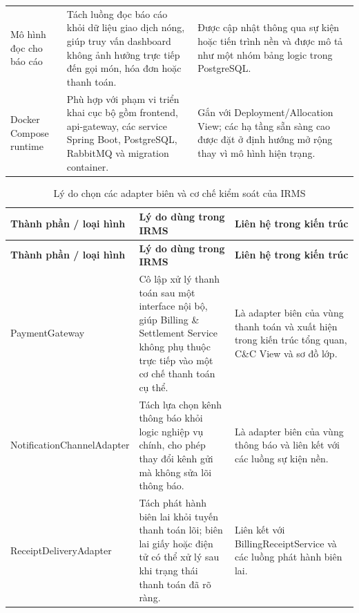 {\begin{longtable}{@{}>{\raggedright\arraybackslash}p{3.0cm} >{\raggedright\arraybackslash}p{5.0cm} >{\raggedright\arraybackslash}p{4.85cm}@{}}
\addlinespace
Mô hình đọc cho báo cáo & Tách luồng đọc báo cáo khỏi dữ liệu giao dịch nóng, giúp truy vấn dashboard không ảnh hưởng trực tiếp đến gọi món, hóa đơn hoặc thanh toán. & Được cập nhật thông qua sự kiện hoặc tiến trình nền và được mô tả như một nhóm bảng logic trong \textsf{PostgreSQL}. \\
\addlinespace
\textsf{Docker Compose} runtime & Phù hợp với phạm vi triển khai cục bộ gồm frontend, api-gateway, các service \textsf{Spring Boot}, \textsf{PostgreSQL}, \textsf{RabbitMQ} và migration container. & Gắn với Deployment/Allocation View; các hạ tầng sẵn sàng cao được đặt ở định hướng mở rộng thay vì mô hình hiện trạng. \\
\bottomrule
\end{longtable}
\normalsize
}

{\small
\setlength{\LTleft}{0pt}
\setlength{\LTright}{0pt}
\setlength{\tabcolsep}{3pt}
\renewcommand{\arraystretch}{1.16}
\begin{longtable}{@{}>{\raggedright\arraybackslash}p{3.0cm} >{\raggedright\arraybackslash}p{5.0cm} >{\raggedright\arraybackslash}p{4.85cm}@{}}
\caption{Lý do chọn các adapter biên và cơ chế kiểm soát của IRMS}\label{tab:appendix-component-rationale-adapters}\\
\toprule
\textbf{Thành phần / loại hình} & \textbf{Lý do dùng trong IRMS} & \textbf{Liên hệ trong kiến trúc} \\
\midrule
\endfirsthead
\toprule
\textbf{Thành phần / loại hình} & \textbf{Lý do dùng trong IRMS} & \textbf{Liên hệ trong kiến trúc} \\
\midrule
\endhead
\textsf{PaymentGateway} & Cô lập xử lý thanh toán sau một interface nội bộ, giúp \textsf{Billing \& Settlement Service} không phụ thuộc trực tiếp vào một cơ chế thanh toán cụ thể. & Là adapter biên của vùng thanh toán và xuất hiện trong kiến trúc tổng quan, C\&C View và sơ đồ lớp. \\
\addlinespace
\textsf{Notification}\-\textsf{Channel}\-\textsf{Adapter} & Tách lựa chọn kênh thông báo khỏi logic nghiệp vụ chính, cho phép thay đổi kênh gửi mà không sửa lõi thông báo. & Là adapter biên của vùng thông báo và liên kết với các luồng sự kiện nền. \\
\addlinespace
\textsf{Receipt}\-\textsf{Delivery}\-\textsf{Adapter} & Tách phát hành biên lai khỏi tuyến thanh toán lõi; biên lai giấy hoặc điện tử có thể xử lý sau khi trạng thái thanh toán đã rõ ràng. & Liên kết với \textsf{BillingReceiptService} và các luồng phát hành biên lai. \\

\end{longtable}}
